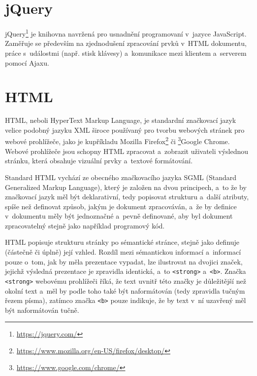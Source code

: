\documentclass[a4paper,11pt,openany]{book} %
\begin{document}

\section{jQuery}

jQuery\footnote{\url{https://jquery.com/}} je knihovna navržená pro usnadnění programovaní v~jazyce JavaScript. Zaměřuje se především na zjednodušení zpracování prvků v~HTML dokumentu, práce s~událostmi (např. stisk klávesy) a~komunikace mezi klientem a~serverem pomocí Ajaxu.

\section{HTML}

HTML, neboli HyperText Markup Language, je standardní značkovací jazyk velice podobný jazyku XML široce používaný pro tvorbu webových stránek pro webové prohlížeče, jako je kupříkladu Mozilla Firefox\footnote{\url{https://www.mozilla.org/en-US/firefox/desktop/}} či \footnote{\url{https://www.google.com/chrome/}}Google Chrome. Webové prohlížeče jsou schopny HTML zpracovat a~zobrazit uživateli výslednou stránku, která obsahuje vizuální prvky a~textové formátování. \parencite[19--22]{raggett1999html}

Standard HTML vychází ze obecného značkovacího jazyka SGML (Standard Generalized Markup Language), který je založen na dvou principech, a~to že by značkovací jazyk měl být deklarativní, tedy popisovat strukturu a~další atributy, spíše než definovat způsob, jakým je dokument zpracováván, a~že by definice v~dokumentu měly být jednoznačné a~pevně definované, aby byl dokument zpracovatelný stejně jako například programový kód. \parencite{rubinsky1990sgml} %


HTML popisuje strukturu stránky po sémantické stránce, stejně jako definuje (částečně či úplně) její vzhled. Rozdíl mezi sémantickou informací a~informací pouze o~tom, jak by měla prezentace vypadat, lze ilustrovat na dvojici značek, jejichž výsledná prezentace je zpravidla identická, a~to {\tt <strong>} a~{\tt <b>}. Značka {\tt <strong>} webovému prohlížeči říká, že text uvnitř této značky je důležitější než okolní text a~měl by podle toho také být naformátován (tedy zpravidla tučným řezem písma), zatímco značka {\tt <b>} pouze indikuje, že by text v~ní uzavřený měl být naformátován tučně. %
\end{document}
